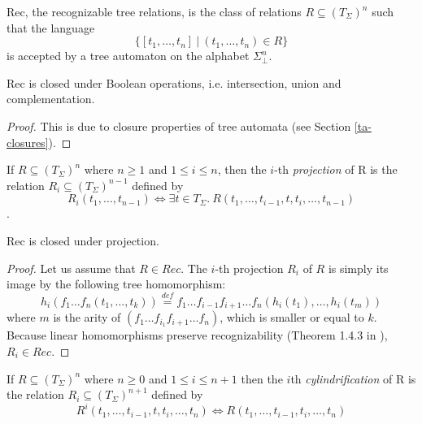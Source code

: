 \begin{defz}
Rec, the recognizable tree relations, is the class of relations $R \subseteq
(T_\Sigma)^n$ such that the language 
\begin{equation}
\{[t_1,\ldots,t_n]\ |\ (t_1,\ldots,t_n)
\in R\}
\end{equation} is accepted by a tree automaton on the alphabet $\Sigma_\bot^n$.
\end{defz}

\begin{prop}
Rec is closed under Boolean operations, i.e. intersection, union and
complementation.
\end{prop}

\begin{proof}
This is due to closure properties of tree automata (see Section
\ref{ta-closures}).
\end{proof}

\begin{defz}
If $R \subseteq (T_\Sigma)^n$ where $n \geq 1$ and $1 \leq i \leq n$, then the
$i$-th \emph{projection} of R is the relation $R_i \subseteq (T_\Sigma)^{n-1}$
defined by 
\begin{equation}
 R_i(t_1,\ldots,t_{n-1}) \Leftrightarrow \exists t \in T_\Sigma
.\ R(t_1,\ldots,t_{i-1},t,t_i,\ldots,t_{n-1})
\end{equation}.
\end{defz}

\begin{lemma}
Rec is closed under projection.
\end{lemma}

\begin{proof}
 Let us assume that $R \in Rec$. The $i$-th projection $R_i$ of $R$ is simply
 its image by the following tree homomorphism:
 \begin{equation}
 h_i(f_1\ldots f_n (t_1,\ldots,t_k)) \overset{\mathit{def}}{=} f_1\ldots f_{i-1}f_{i+1}\ldots f_n(h_i(t_1),\ldots,h_i(t_m))
\end{equation}
where $m$ is the arity of $(f_1\ldots f_{i_1}f_{i+1}\ldots f_n)$, which is
smaller or equal to $k$. Because linear homomorphisms preserve recognizability
(Theorem 1.4.3 in \cite{tata}), $R_i \in Rec$.
\end{proof}

\begin{defz}
 If $R \subseteq (T_\Sigma)^n$ where $n \geq 0$ and $1 \leq i \leq n+1$ then the
 $i$th \emph{cylindrification} of R is the relation $R_i \subseteq
 (T_\Sigma)^{n+1}$ defined by 
\begin{equation}
 R^i(t_1,\ldots,t_{i-1},t,t_i,\ldots,t_n)
 \Leftrightarrow R(t_1,\ldots,t_{i-1},t_i,\ldots,t_n)
\end{equation}
\end{defz}

